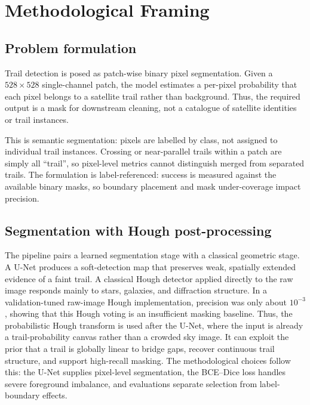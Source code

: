\documentclass{cam-thesis}
\begin{document}
\chapter{Methodological Framing}
\label{ch:methodology}

\section{Problem formulation}
\label{sec:formulation}

Trail detection is posed as patch-wise binary pixel segmentation. Given a
$528\times528$ single-channel patch, the model estimates a
per-pixel probability that each pixel belongs to a satellite trail rather than
background. Thus, the required output is a mask for downstream cleaning, not
a catalogue of satellite identities or trail instances.

This is semantic segmentation: pixels are labelled by class, not assigned to
individual trail instances. Crossing or near-parallel trails within a patch are
simply all ``trail'', so pixel-level metrics
cannot distinguish merged from separated trails. The formulation is label-referenced:
success is measured against the available binary masks, so boundary placement
and mask under-coverage impact precision.

\section{Segmentation with Hough post-processing}
\label{sec:why_method}

The pipeline pairs a learned segmentation stage with a classical geometric stage.
A U-Net produces a soft-detection map that preserves weak, spatially extended
evidence of a faint trail. A classical Hough detector applied directly to the
raw image responds mainly to stars, galaxies, and diffraction
structure. In a validation-tuned raw-image Hough implementation, precision was
only about $10^{-3}$, showing that this Hough voting is an insufficient
masking baseline. Thus, the probabilistic Hough transform is used after the
U-Net, where the input is already a trail-probability canvas rather than a
crowded sky image. It can exploit the prior that a trail is globally
linear to bridge gaps, recover continuous trail structure, and support
high-recall masking. The methodological choices follow this: the U-Net
supplies pixel-level segmentation, the BCE--Dice loss handles severe foreground
imbalance, and evaluations separate selection from label-boundary effects.
\end{document}
